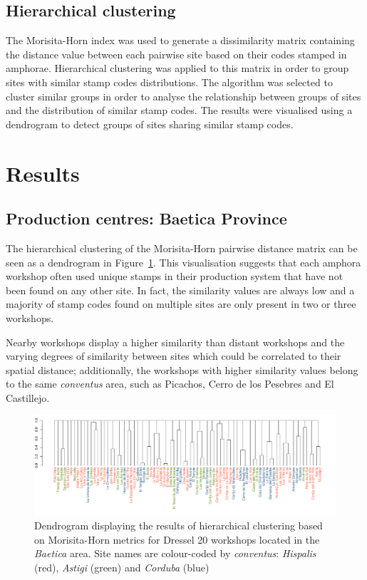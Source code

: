 \subsection{Hierarchical clustering}
\label{sec:5}

The Morisita-Horn index was used to generate a dissimilarity matrix containing the distance value between each pairwise site based on their codes stamped in amphorae. Hierarchical clustering was applied to this matrix in order to group sites with similar stamp codes distributions. The algorithm was selected to cluster similar groups in order to analyse the relationship between groups of sites and the distribution of similar stamp codes. The results were visualised using a dendrogram to detect groups of sites sharing similar stamp codes.  


\section{Results}
\label{sec:6}

\subsection{Production centres: Baetica Province}
\label{sec:6}

The hierarchical clustering of the Morisita-Horn pairwise distance matrix can be seen as a dendrogram in Figure~\ref{dendro}. This visualisation suggests that each amphora workshop often used unique stamps in their production system that have not been found on any other site. In fact, the similarity values are always low and a majority of stamp codes found on multiple sites are only present in two or three workshops.

Nearby workshops display a higher similarity than distant workshops and the varying degrees of similarity between sites which could be correlated to their spatial distance; additionally, the workshops with higher similarity values belong to the same \textit{conventus} area, such as Picachos, Cerro de los Pesebres and El Castillejo.


\begin{figure}[htp]
	\centering
\includegraphics[angle=270, width=0.7\linewidth]{dendro}
\caption{Dendrogram displaying the results of hierarchical clustering based on Morisita-Horn metrics for Dressel 20 workshops located in the \textit{Baetica} area. Site names are colour-coded by \textit{conventus}: \textit{Hispalis} (red), \textit{Astigi} (green) and \textit{Corduba} (blue)}
\label{dendro}

\end{figure}

